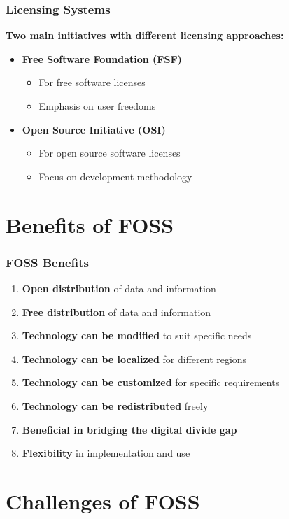 \documentclass[aspectratio=169]{beamer}
\begin{document}
\begin{frame}
\frametitle{Licensing Systems}
\textbf{Two main initiatives with different licensing approaches:}

\begin{itemize}
\item \textbf{Free Software Foundation (FSF)}
    \begin{itemize}
    \item For free software licenses
    \item Emphasis on user freedoms
    \end{itemize}
\item \textbf{Open Source Initiative (OSI)}
    \begin{itemize}
    \item For open source software licenses
    \item Focus on development methodology
    \end{itemize}
\end{itemize}
\end{frame}

\section{Benefits of FOSS}

\begin{frame}
\frametitle{FOSS Benefits}
\begin{enumerate}
\item \textbf{Open distribution} of data and information
\item \textbf{Free distribution} of data and information
\item \textbf{Technology can be modified} to suit specific needs
\item \textbf{Technology can be localized} for different regions
\item \textbf{Technology can be customized} for specific requirements
\item \textbf{Technology can be redistributed} freely
\item \textbf{Beneficial in bridging the digital divide gap}
\item \textbf{Flexibility} in implementation and use
\end{enumerate}
\end{frame}

\section{Challenges of FOSS}
\end{document}
